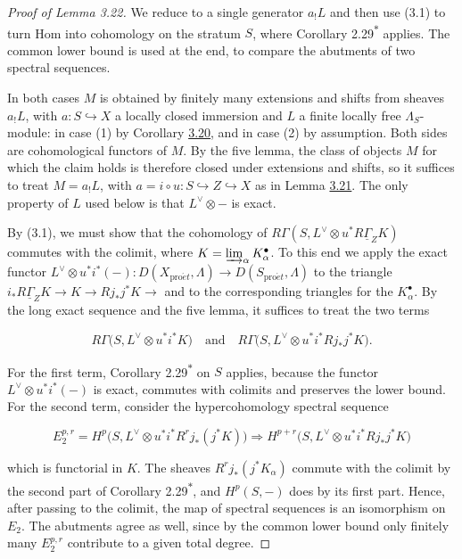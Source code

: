 \documentclass[11pt]{article}
\newcommand{\bpout}[1]{#1\textsuperscript{\hyperlink{bp-outside}{\ensuremath{\ast}}}}
\begin{document}
\begin{proof}[{Proof of Lemma 3.22}]\label{bp70}%
We reduce to a single generator \(a_!L\) and then use (3.1) to turn Hom into cohomology on the stratum \(S\), where Corollary \bpout{2.29} applies. The common lower bound is used at the end, to compare the abutments of two spectral sequences.

In both cases \(M\) is obtained by finitely many extensions and shifts from sheaves \(a_!L\), with \(a:S\hookrightarrow X\) a locally closed immersion and \(L\) a finite locally free \(\Lambda_S\)-module: in case (1) by Corollary \hyperref[bp61]{3.20}, and in case (2) by assumption. Both sides are cohomological functors of \(M\). By the five lemma, the class of objects \(M\) for which the claim holds is therefore closed under extensions and shifts, so it suffices to treat \(M=a_!L\), with \(a=i\circ
u:S\hookrightarrow Z\hookrightarrow X\) as in Lemma \hyperref[bp65]{3.21}. The only property of \(L\) used below is that \(L^\vee\otimes-\) is exact.

By (3.1), we must show that the cohomology of \(R\Gamma(S,L^\vee\otimes u^*R\underline\Gamma_ZK)\) commutes with the colimit, where \(K=\varinjlim_\alpha K_\alpha^\bullet\). To this end we apply the exact functor \(L^\vee\otimes u^*i^*(-):D(X_{\mathrm{pro}\acute{e}t},\Lambda)\to D(S_{\mathrm{pro}\acute{e}t},\Lambda)\) to the triangle \(i_*R\underline\Gamma_ZK\to K\to Rj_*j^*K\to\) and to the corresponding triangles for the \(K_\alpha^\bullet\). By the long exact sequence and the five lemma, it suffices to treat the two terms

\[
R\Gamma\bigl(S,L^\vee\otimes u^*i^*K\bigr)
\quad\text{and}\quad
R\Gamma\bigl(S,L^\vee\otimes u^*i^*Rj_*j^*K\bigr).
\]

For the first term, Corollary \bpout{2.29} on \(S\) applies, because the functor \(L^\vee\otimes u^*i^*(-)\) is exact, commutes with colimits and preserves the lower bound. For the second term, consider the hypercohomology spectral sequence

\[
E_2^{p,r}=H^p\bigl(S,L^\vee\otimes u^*i^*R^rj_*(j^*K)\bigr)
\Longrightarrow
H^{p+r}\bigl(S,L^\vee\otimes u^*i^*Rj_*j^*K\bigr)
\]

which is functorial in \(K\). The sheaves \(R^rj_*(j^*K_\alpha)\) commute with the colimit by the second part of Corollary \bpout{2.29}, and \(H^p(S,-)\) does by its first part. Hence, after passing to the colimit, the map of spectral sequences is an isomorphism on \(E_2\). The abutments agree as well, since by the common lower bound only finitely many \(E_2^{p,r}\) contribute to a given total degree.
\end{proof}
\end{document}
